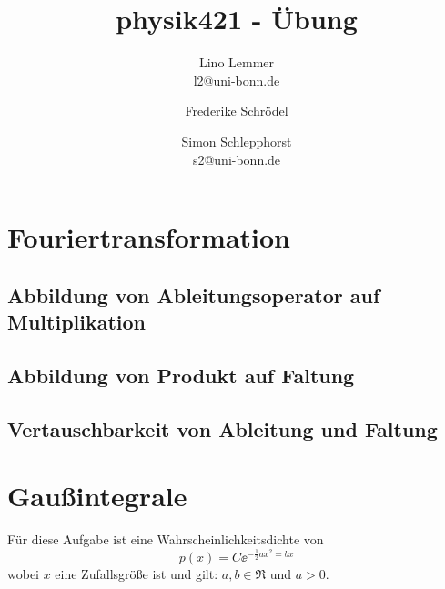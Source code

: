 

\setcounter{thezettel}{3}
\renewcommand\thesection{\arabic{thezettel}.\arabic{section}}


\title{physik421 - Übung }
\author{Lino Lemmer \\ \small{l2@uni-bonn.de} \and Frederike Schrödel \and Simon Schlepphorst\\ \small{s2@uni-bonn.de}}


\maketitle

\section{Fouriertransformation}

\subsection{Abbildung von Ableitungsoperator auf Multiplikation}

\subsection{}

\subsection{Abbildung von Produkt auf Faltung}

\subsection{Vertauschbarkeit von Ableitung und Faltung}

\section{Gaußintegrale}
Für diese Aufgabe ist eine Wahrscheinlichkeitsdichte von 
\[
    p(x) = C\ee^{-\frac 12ax^2=bx} 
\]
wobei $x$ eine Zufallsgröße ist und gilt: $a,b\in\Re$ und $a>0$.

